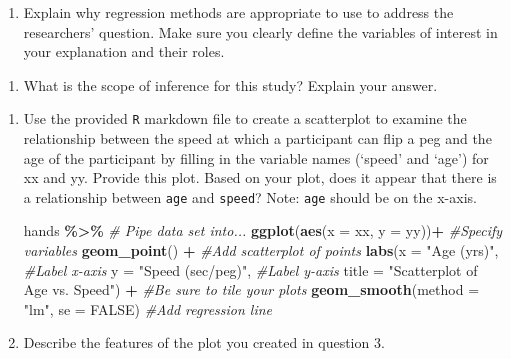 \documentclass[
]{report}
\newenvironment{Shaded}{\begin{snugshade}}{\end{snugshade}}
\newcommand{\CommentTok}[1]{\textcolor[rgb]{0.56,0.35,0.01}{\textit{#1}}}
\newcommand{\DataTypeTok}[1]{\textcolor[rgb]{0.13,0.29,0.53}{#1}}
\newcommand{\KeywordTok}[1]{\textcolor[rgb]{0.13,0.29,0.53}{\textbf{#1}}}
\newcommand{\NormalTok}[1]{#1}
\newcommand{\OperatorTok}[1]{\textcolor[rgb]{0.81,0.36,0.00}{\textbf{#1}}}
\newcommand{\OtherTok}[1]{\textcolor[rgb]{0.56,0.35,0.01}{#1}}
\newcommand{\StringTok}[1]{\textcolor[rgb]{0.31,0.60,0.02}{#1}}
\providecommand{\tightlist}{%
  \setlength{\itemsep}{0pt}\setlength{\parskip}{0pt}}
\begin{document}
\begin{enumerate}
\def\labelenumi{\arabic{enumi}.}
\tightlist
\item
  Explain why regression methods are appropriate to use to address the researchers' question. Make sure you clearly define the variables of interest in your explanation and their roles.
\end{enumerate}

\vspace{1in}

\begin{enumerate}
\def\labelenumi{\arabic{enumi}.}
\setcounter{enumi}{1}
\tightlist
\item
  What is the scope of inference for this study? Explain your answer.
\end{enumerate}

\vspace{1in}

\begin{enumerate}
\def\labelenumi{\arabic{enumi}.}
\setcounter{enumi}{2}
\item
  Use the provided \texttt{R} markdown file to create a scatterplot to examine the relationship between the speed at which a participant can flip a peg and the age of the participant by filling in the variable names (`speed' and `age') for xx and yy. Provide this plot. Based on your plot, does it appear that there is a relationship between \texttt{age} and \texttt{speed}? Note: \texttt{age} should be on the x-axis.

\begin{Shaded}
\begin{Highlighting}[]
\NormalTok{hands }\OperatorTok{\%\textgreater{}\%}\StringTok{ }\CommentTok{\# Pipe data set into...}
\KeywordTok{ggplot}\NormalTok{(}\KeywordTok{aes}\NormalTok{(}\DataTypeTok{x =}\NormalTok{ xx, }\DataTypeTok{y =}\NormalTok{ yy))}\OperatorTok{+}\StringTok{  }\CommentTok{\#Specify variables}
\StringTok{  }\KeywordTok{geom\_point}\NormalTok{() }\OperatorTok{+}\StringTok{  }\CommentTok{\#Add scatterplot of points}
\StringTok{  }\KeywordTok{labs}\NormalTok{(}\DataTypeTok{x =} \StringTok{"Age (yrs)"}\NormalTok{,  }\CommentTok{\#Label x{-}axis}
       \DataTypeTok{y =} \StringTok{"Speed (sec/peg)"}\NormalTok{,  }\CommentTok{\#Label y{-}axis}
       \DataTypeTok{title =} \StringTok{"Scatterplot of Age vs. Speed"}\NormalTok{) }\OperatorTok{+}\StringTok{ }\CommentTok{\#Be sure to tile your plots}
\StringTok{  }\KeywordTok{geom\_smooth}\NormalTok{(}\DataTypeTok{method =} \StringTok{"lm"}\NormalTok{, }\DataTypeTok{se =} \OtherTok{FALSE}\NormalTok{)  }\CommentTok{\#Add regression line}
\end{Highlighting}
\end{Shaded}

  \vspace{2in}
\item
  Describe the features of the plot you created in question 3.
\end{enumerate}
\end{document}
